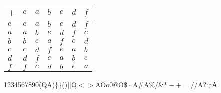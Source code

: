 \documentclass[a4paper,11pt]{article}
\theoremstyle{plain}
\theoremstyle{definition}
\begin{document}
\begin{center}
\begin{tabular}{l|llllll}
	  + & $e$ & $a$ & $b$ & $c$ & $d$ & $f$ \\ \hline
	$e$ & $e$ & $a$ & $b$ & $c$ & $d$ & $f$ \\
	$a$ & $a$ & $b$ & $e$ & $d$ & $f$ & $c$ \\
	$b$ & $b$ & $e$ & $a$ & $f$ & $c$ & $d$ \\
	$c$ & $c$ & $d$ & $f$ & $e$ & $a$ & $b$ \\
	$d$ & $d$ & $f$ & $c$ & $a$ & $b$ & $e$ \\
	$f$ & $f$ & $c$ & $d$ & $b$ & $e$ & $a$ \\
\end{tabular}
\end{center}
1234567890(QA)\{\}()[]Q$<>$AOo0@O\$$\sim$A\#A\%/\&$*-+=/$/A?:;i\|A
\end{document}
